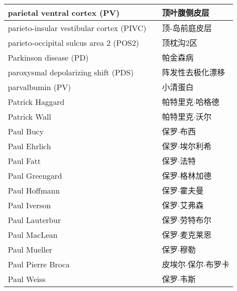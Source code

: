 \begin{longtable}{lll}
	\midrule
	parietal ventral cortex (PV)     && 顶叶腹侧皮层   \\
	
	\midrule
	parieto-insular vestibular cortex (PIVC)     && 顶-岛前庭皮层   \\
	
	\midrule
	parieto-occipital sulcus area 2  (POS2)   && 顶枕沟2区   \\
	
	\midrule
	Parkinson disease (PD)   && 帕金森病   \\
	
	\midrule
	paroxysmal depolarizing shift (PDS)     && 阵发性去极化漂移   \\
	
	\midrule
	parvalbumin  (PV)   && 小清蛋白   \\
	
	\midrule
	Patrick Haggard     && 帕特里克$\cdot$哈格德   \\
	
	\midrule
	Patrick Wall     && 帕特里克$\cdot$沃尔   \\
	
	\midrule
	Paul Bucy     && 保罗$\cdot$布西  \\
	
	\midrule
	Paul Ehrlich     && 保罗$\cdot$埃尔利希  \\
	
	\midrule
	Paul Fatt     && 保罗$\cdot$法特  \\
	
	\midrule
	Paul Greengard     && 保罗$\cdot$格林加德  \\
	
	\midrule
	Paul Hoffmann     && 保罗$\cdot$霍夫曼  \\
	
	\midrule
	Paul Iverson     && 保罗$\cdot$艾弗森  \\
	
	\midrule
	Paul Lauterbur     && 保罗$\cdot$劳特布尔  \\
	
	\midrule
	Paul MacLean     && 保罗$\cdot$麦克莱恩  \\
	
	\midrule
	Paul Mueller     && 保罗$\cdot$穆勒  \\
	
	\midrule
	Paul Pierre Broca     && 皮埃尔$\cdot$保尔$\cdot$布罗卡  \\
	
	\midrule
	Paul Weiss     && 保罗$\cdot$韦斯  \\
	

\end{longtable}
